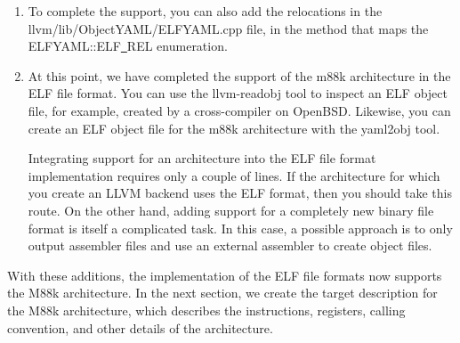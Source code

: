 \begin{enumerate}
\item To complete the support, you can also add the relocations in the llvm/lib/ObjectYAML/ELFYAML.cpp file, in the method that maps the ELFYAML::ELF\underline{~}REL enumeration.

\item At this point, we have completed the support of the m88k architecture in the ELF file format. You can use the llvm-readobj tool to inspect an ELF object file, for example, created by a cross-compiler on OpenBSD. Likewise, you can create an ELF object file for the m88k architecture with the yaml2obj tool.
\begin{tcolorbox}[colback=blue!5!white,colframe=blue!75!black, title=Is adding support for an object file format mandatory?]
	
Integrating support for an architecture into the ELF file format implementation requires only a couple of lines. If the architecture for which you create an LLVM backend uses the ELF format, then you should take this route. On the other hand, adding support for a completely new binary file format is itself a complicated task. In this case, a possible approach is to only output assembler files and use an external assembler to create object files.
\end{tcolorbox}

\end{enumerate}

With these additions, the implementation of the ELF file formats now supports the M88k architecture. In the next section, we create the target description for the M88k architecture, which describes the instructions, registers, calling convention, and other details of the architecture.\par























































